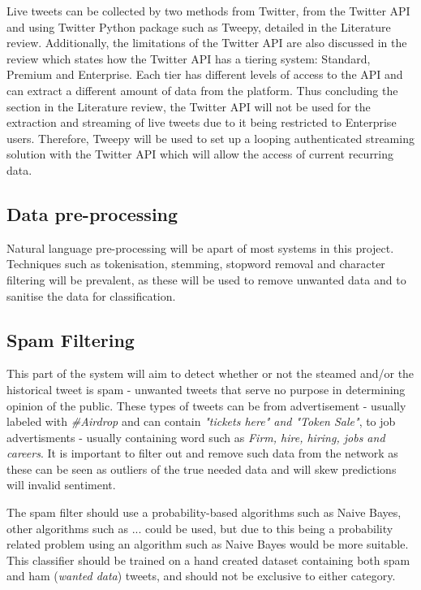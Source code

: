 \documentclass[oneside, 10pt]{article}
\begin{document}
		Live tweets can be collected by two methods from Twitter, from the Twitter API and using Twitter Python package such as Tweepy, detailed in the Literature review. Additionally, the limitations of the Twitter API are also discussed in the review which states how the Twitter API has a tiering system: Standard, Premium and Enterprise. Each tier has different levels of access to the API and can extract a different amount of data from the platform. Thus concluding the section in the Literature review, the Twitter API will not be used for the extraction and streaming of live tweets due to it being restricted to Enterprise users. Therefore, Tweepy will be used to set up a looping authenticated streaming solution with the Twitter API which will allow the access of current recurring data.
		
		\subsection{Data pre-processing}
		Natural language pre-processing will be apart of most systems in this project. Techniques such as tokenisation, stemming, stopword removal and character filtering will be prevalent, as these will be used to remove unwanted data and to sanitise the data for classification.
		
		\subsection{Spam Filtering}
		This part of the system will aim to detect whether or not the steamed and/or the historical tweet is spam - unwanted tweets that serve no purpose in determining opinion of the public. These types of tweets can be from advertisement - usually labeled with \textit{\#Airdrop} and can contain \textit{"tickets here" and "Token Sale"}, to job advertisments - usually containing word such as \textit{Firm, hire, hiring, jobs and careers}. It is important to filter out and remove such data from the network as these can be seen as outliers of the true needed data and will skew predictions will invalid sentiment.
		
		The spam filter should use a probability-based algorithms such as Naive Bayes, other algorithms such as ... could be used, but due to this being a probability related problem using an algorithm such as Naive Bayes would be more suitable. This classifier should be trained on a hand created dataset containing both spam and ham (\textit{wanted data}) tweets, and should not be exclusive to either category.
		
\end{document}
